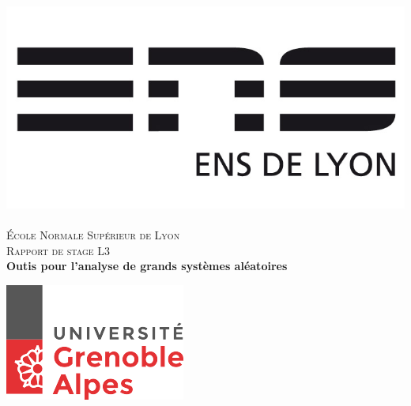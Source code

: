 \documentclass[a4paper,12pt]{report}
\date{\today}
\begin{document}
\lstset{
  language=Python,
} 


\begin{titlepage}
  \begin{sffamily}
  \begin{center}

    \includegraphics[scale=0.3]{ensl.jpg}~\\[1.5cm]

    \textsc{\LARGE École Normale Supérieur de Lyon}\\[2cm]

    \textsc{\Large Rapport de stage L3}\\[1.5cm]

    { \huge \bfseries Outis pour l'analyse de grands systèmes aléatoires\\[1cm] }

    \includegraphics[scale=0.6]{logo-uga.png}
    \\[2cm]


\end{center}
\end{sffamily}
\end{titlepage}
\end{document}
